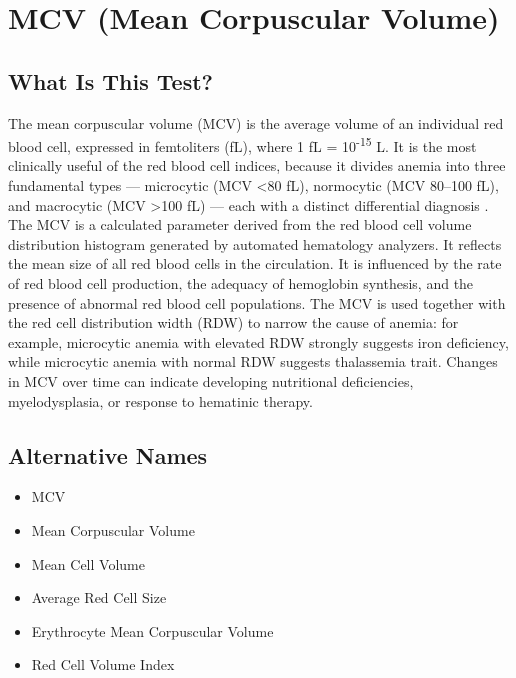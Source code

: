 \chapter{MCV (Mean Corpuscular Volume)}

\section*{What Is This Test?}
The mean corpuscular volume (MCV) is the average volume of an individual red blood cell, expressed in femtoliters (fL), where 1 fL = 10\textsuperscript{-15} L. It is the most clinically useful of the red blood cell indices, because it divides anemia into three fundamental types --- microcytic (MCV <80 fL), normocytic (MCV 80--100 fL), and macrocytic (MCV >100 fL) --- each with a distinct differential diagnosis \cite{tierney2023current}. The MCV is a calculated parameter derived from the red blood cell volume distribution histogram generated by automated hematology analyzers. It reflects the mean size of all red blood cells in the circulation. It is influenced by the rate of red blood cell production, the adequacy of hemoglobin synthesis, and the presence of abnormal red blood cell populations. The MCV is used together with the red cell distribution width (RDW) to narrow the cause of anemia: for example, microcytic anemia with elevated RDW strongly suggests iron deficiency, while microcytic anemia with normal RDW suggests thalassemia trait. Changes in MCV over time can indicate developing nutritional deficiencies, myelodysplasia, or response to hematinic therapy.

\section*{Alternative Names}
\begin{itemize}
  \item MCV
  \item Mean Corpuscular Volume
  \item Mean Cell Volume
  \item Average Red Cell Size
  \item Erythrocyte Mean Corpuscular Volume
  \item Red Cell Volume Index
\end{itemize}
